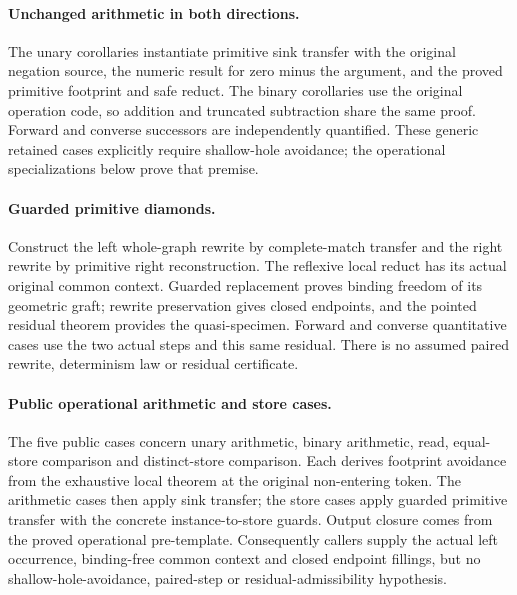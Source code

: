 \paragraph{Unchanged arithmetic in both directions.}
The unary corollaries instantiate primitive sink transfer with the original
negation source, the numeric result for zero minus the argument, and the
proved primitive footprint and safe reduct. The binary corollaries use the
original operation code, so addition and truncated subtraction share the
same proof. Forward and converse successors are independently quantified.
These generic retained cases explicitly require shallow-hole avoidance;
the operational specializations below prove that premise.


\paragraph{Guarded primitive diamonds.}
Construct the left whole-graph rewrite by complete-match transfer and the
right rewrite by primitive right reconstruction. The reflexive local reduct
has its actual original common context. Guarded replacement proves binding
freedom of its geometric graft; rewrite preservation gives closed endpoints,
and the pointed residual theorem provides the quasi-specimen. Forward and
converse quantitative cases use the two actual steps and this same residual.
There is no assumed paired rewrite, determinism law or residual certificate.


\paragraph{Public operational arithmetic and store cases.}
The five public cases concern unary arithmetic, binary arithmetic, read,
equal-store comparison and distinct-store comparison. Each derives footprint
avoidance from the exhaustive local theorem at the original non-entering token.
The arithmetic cases then apply sink transfer; the store cases apply guarded
primitive transfer with the concrete instance-to-store guards. Output closure
comes from the proved operational pre-template. Consequently callers supply
the actual left occurrence, binding-free common context and closed endpoint
fillings, but no shallow-hole-avoidance, paired-step or residual-admissibility hypothesis.

